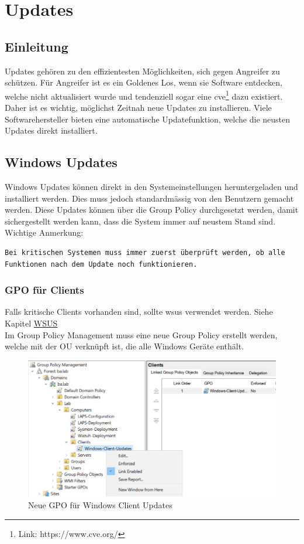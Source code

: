 \chapter{Updates}
\section{Einleitung}
Updates gehören zu den effizientesten Möglichkeiten, sich gegen Angreifer zu schützen.
Für Angreifer ist es ein Goldenes Los, wenn sie Software entdecken, welche nicht aktualisiert wurde und tendenziell sogar eine \acrfull{cve}\footnote{Link: https://www.cve.org/} dazu existiert.\\

Daher ist es wichtig, möglichst Zeitnah neue Updates zu installieren.
Viele Softwarehersteller bieten eine automatische Updatefunktion, welche die neusten Updates direkt installiert.

\section{Windows Updates}
Windows Updates können direkt in den Systemeinstellungen heruntergeladen und installiert werden.
Dies muss jedoch standardmässig von den Benutzern gemacht werden.
Diese Updates können über die Group Policy durchgesetzt werden, damit sichergestellt werden kann, dass die System immer auf neustem Stand sind.\\

Wichtige Anmerkung:
\begin{lstlisting}
Bei kritischen Systemen muss immer zuerst überprüft werden, ob alle Funktionen nach dem Update noch funktionieren.
\end{lstlisting}

\subsection{GPO für Clients}
Falls kritische Clients vorhanden sind, sollte \acrfull{wsus} verwendet werden. Siehe Kapitel \hyperref[subsec:wsus]{WSUS}\\

Im Group Policy Management muss eine neue Group Policy erstellt werden, welche mit der OU verknüpft ist, die alle Windows Geräte enthält.
\begin{figure}[H]
    \centering
    \includegraphics[width=0.7\linewidth]{../img/Updates/edit-gpo-clinets.png}
    \caption{Neue GPO für Windows Client Updates}
\end{figure}

